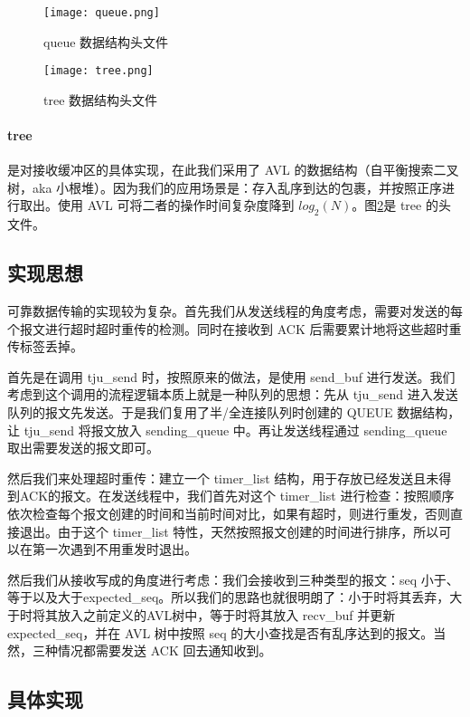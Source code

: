 \begin{figure}[!htbp]
    \centering
    \texttt{[image: queue.png]}
    \label{fig:queue}\caption{queue 数据结构头文件}
  \end{figure}

  \begin{figure}[!htbp]
    \centering
    \texttt{[image: tree.png]}
    \label{fig:tree}\caption{tree 数据结构头文件}
  \end{figure}
  
\paragraph*{tree} 是对接收缓冲区的具体实现，在此我们采用了 AVL 的数据结构（自平衡搜索二叉树，aka 小根堆）。因为我们的应用场景是：存入乱序到达的包裹，并按照正序进行取出。使用 AVL 可将二者的操作时间复杂度降到 $log_2(N)$。图\ref{fig:tree}是 tree 的头文件。

\subsection{实现思想}

可靠数据传输的实现较为复杂。首先我们从发送线程的角度考虑，需要对发送的每个报文进行超时超时重传的检测。同时在接收到 ACK 后需要累计地将这些超时重传标签丢掉。

首先是在调用 tju\_send 时，按照原来的做法，是使用 send\_buf 进行发送。我们考虑到这个调用的流程逻辑本质上就是一种队列的思想：先从 tju\_send 进入发送队列的报文先发送。于是我们复用了半/全连接队列时创建的 QUEUE 数据结构，让 tju\_send 将报文放入 sending\_queue 中。再让发送线程通过 sending\_queue 取出需要发送的报文即可。

然后我们来处理超时重传：建立一个 timer\_list 结构，用于存放已经发送且未得到ACK的报文。在发送线程中，我们首先对这个 timer\_list 进行检查：按照顺序依次检查每个报文创建的时间和当前时间对比，如果有超时，则进行重发，否则直接退出。由于这个 timer\_list 特性，天然按照报文创建的时间进行排序，所以可以在第一次遇到不用重发时退出。

然后我们从接收写成的角度进行考虑：我们会接收到三种类型的报文：seq 小于、等于以及大于expected\_seq。所以我们的思路也就很明朗了：小于时将其丢弃，大于时将其放入之前定义的AVL树中，等于时将其放入 recv\_buf 并更新 expected\_seq，并在 AVL 树中按照 seq 的大小查找是否有乱序达到的报文。当然，三种情况都需要发送 ACK 回去通知收到。

\subsection{具体实现}

